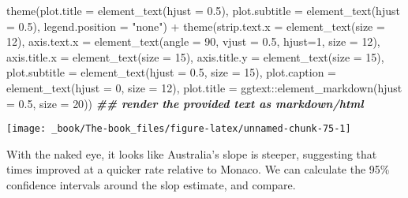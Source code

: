 \documentclass[
]{book}
\newenvironment{Shaded}{\begin{snugshade}}{\end{snugshade}}
\newcommand{\AttributeTok}[1]{\textcolor[rgb]{0.77,0.63,0.00}{#1}}
\newcommand{\DecValTok}[1]{\textcolor[rgb]{0.00,0.00,0.81}{#1}}
\newcommand{\DocumentationTok}[1]{\textcolor[rgb]{0.56,0.35,0.01}{\textbf{\textit{#1}}}}
\newcommand{\FloatTok}[1]{\textcolor[rgb]{0.00,0.00,0.81}{#1}}
\newcommand{\FunctionTok}[1]{\textcolor[rgb]{0.00,0.00,0.00}{#1}}
\newcommand{\NormalTok}[1]{#1}
\newcommand{\SpecialCharTok}[1]{\textcolor[rgb]{0.00,0.00,0.00}{#1}}
\newcommand{\StringTok}[1]{\textcolor[rgb]{0.31,0.60,0.02}{#1}}
\begin{document}
\begin{Shaded}
\begin{Highlighting}[]
  \FunctionTok{theme}\NormalTok{(}\AttributeTok{plot.title =} \FunctionTok{element\_text}\NormalTok{(}\AttributeTok{hjust =} \FloatTok{0.5}\NormalTok{),}
        \AttributeTok{plot.subtitle =} \FunctionTok{element\_text}\NormalTok{(}\AttributeTok{hjust =} \FloatTok{0.5}\NormalTok{),}
        \AttributeTok{legend.position =} \StringTok{"none"}\NormalTok{)  }\SpecialCharTok{+}
  \FunctionTok{theme}\NormalTok{(}\AttributeTok{strip.text.x =} \FunctionTok{element\_text}\NormalTok{(}\AttributeTok{size =} \DecValTok{12}\NormalTok{),}
        \AttributeTok{axis.text.x =} \FunctionTok{element\_text}\NormalTok{(}\AttributeTok{angle =} \DecValTok{90}\NormalTok{, }\AttributeTok{vjust =} \FloatTok{0.5}\NormalTok{, }\AttributeTok{hjust=}\DecValTok{1}\NormalTok{, }\AttributeTok{size =} \DecValTok{12}\NormalTok{),}
        \AttributeTok{axis.title.x =} \FunctionTok{element\_text}\NormalTok{(}\AttributeTok{size =} \DecValTok{15}\NormalTok{),}
        \AttributeTok{axis.title.y =} \FunctionTok{element\_text}\NormalTok{(}\AttributeTok{size =} \DecValTok{15}\NormalTok{),}
         \AttributeTok{plot.subtitle =} \FunctionTok{element\_text}\NormalTok{(}\AttributeTok{hjust =} \FloatTok{0.5}\NormalTok{, }\AttributeTok{size =} \DecValTok{15}\NormalTok{),}
         \AttributeTok{plot.caption =} \FunctionTok{element\_text}\NormalTok{(}\AttributeTok{hjust =} \DecValTok{0}\NormalTok{, }\AttributeTok{size =} \DecValTok{12}\NormalTok{),}
        \AttributeTok{plot.title =}\NormalTok{ ggtext}\SpecialCharTok{::}\FunctionTok{element\_markdown}\NormalTok{(}\AttributeTok{hjust =} \FloatTok{0.5}\NormalTok{, }\AttributeTok{size =} \DecValTok{20}\NormalTok{)) }\DocumentationTok{\#\# render the provided text as markdown/html}
\end{Highlighting}
\end{Shaded}

\begin{center}\texttt{[image: \_book/The-book\_files/figure-latex/unnamed-chunk-75-1]} \end{center}

With the naked eye, it looks like Australia's slope is steeper, suggesting that times improved at a quicker rate relative to Monaco. We can calculate the 95\% confidence intervals around the slop estimate, and compare.
\end{document}
